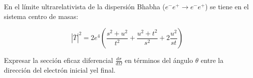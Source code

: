 En el límite ultrarelativista de la dispersión Bhabha ($e^{-} e^{+} \rightarrow e^{-} e^{+}$) se tiene en el sistema centro de masas: 

$$
|\bar{T}|^{2}=2 e^{4}\left(\frac{s^{2}+u^{2}}{t^{2}}+\frac{u^{2}+t^{2}}{s^{2}}+2 \frac{u^{2}}{s t}\right)
$$

Expresar la sección eficaz diferencial $\frac{d\sigma}{d \Omega}$ en términos del ángulo $\theta$ entre la dirección del electrón inicial yel final.

\begin{solution}\ \\

\end{solution}
